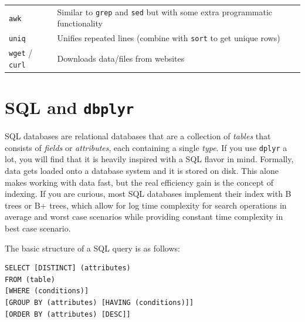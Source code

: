 \documentclass[]{book}
\begin{document}
\begin{longtable}[]{@{}ll@{}}
\begin{minipage}[t]{0.41\columnwidth}\raggedright
\texttt{awk}\strut
\end{minipage} & \begin{minipage}[t]{0.53\columnwidth}\raggedright
Similar to \texttt{grep} and \texttt{sed} but with some extra programmatic functionality\strut
\end{minipage}\tabularnewline
\begin{minipage}[t]{0.41\columnwidth}\raggedright
\texttt{uniq}\strut
\end{minipage} & \begin{minipage}[t]{0.53\columnwidth}\raggedright
Unifies repeated lines (combine with \texttt{sort} to get unique rows)\strut
\end{minipage}\tabularnewline
\begin{minipage}[t]{0.41\columnwidth}\raggedright
\texttt{wget} / \texttt{curl}\strut
\end{minipage} & \begin{minipage}[t]{0.53\columnwidth}\raggedright
Downloads data/files from websites\strut
\end{minipage}\tabularnewline
\bottomrule
\end{longtable}

\hypertarget{sql-and-dbplyr}{%
\section{\texorpdfstring{SQL and \texttt{dbplyr}}{SQL and dbplyr}}\label{sql-and-dbplyr}}

SQL databases are relational databases that are a collection of \emph{tables} that consists of \emph{fields} or \emph{attributes}, each containing a single \emph{type}. If you use \texttt{dplyr} a lot, you will find that it is heavily inspired with a SQL flavor in mind. Formally, data gets loaded onto a database system and it is stored on disk. This alone makes working with data fast, but the real efficiency gain is the concept of indexing. If you are curious, most SQL databases implement their index with B trees or B+ trees, which allow for log time complexity for search operations in average and worst case scenarios while providing constant time complexity in best case scenario.

The basic structure of a SQL query is as follows:

\begin{verbatim}
SELECT [DISTINCT] (attributes)
FROM (table)
[WHERE (conditions)]
[GROUP BY (attributes) [HAVING (conditions)]]
[ORDER BY (attributes) [DESC]]
\end{verbatim}
\end{document}
